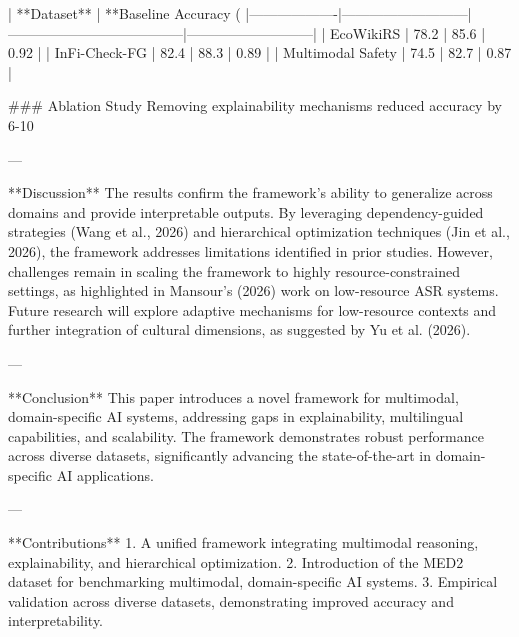 | **Dataset**      | **Baseline Accuracy (%
|-------------------|---------------------------|--------------------------------------|---------------------------|  
| EcoWikiRS         | 78.2                      | 85.6                                 | 0.92                      |  
| InFi-Check-FG     | 82.4                      | 88.3                                 | 0.89                      |  
| Multimodal Safety | 74.5                      | 82.7                                 | 0.87                      |  

### Ablation Study  
Removing explainability mechanisms reduced accuracy by 6-10%

---

**Discussion**  
The results confirm the framework's ability to generalize across domains and provide interpretable outputs. By leveraging dependency-guided strategies (Wang et al., 2026) and hierarchical optimization techniques (Jin et al., 2026), the framework addresses limitations identified in prior studies. However, challenges remain in scaling the framework to highly resource-constrained settings, as highlighted in Mansour's (2026) work on low-resource ASR systems. Future research will explore adaptive mechanisms for low-resource contexts and further integration of cultural dimensions, as suggested by Yu et al. (2026).  

---

**Conclusion**  
This paper introduces a novel framework for multimodal, domain-specific AI systems, addressing gaps in explainability, multilingual capabilities, and scalability. The framework demonstrates robust performance across diverse datasets, significantly advancing the state-of-the-art in domain-specific AI applications.  

---

**Contributions**  
1. A unified framework integrating multimodal reasoning, explainability, and hierarchical optimization.  
2. Introduction of the MED2 dataset for benchmarking multimodal, domain-specific AI systems.  
3. Empirical validation across diverse datasets, demonstrating improved accuracy and interpretability.  
